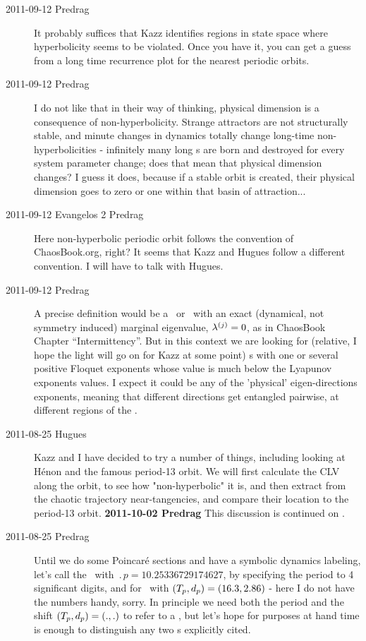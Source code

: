 \begin{description}
\item[2011-09-12 Predrag] It probably suffices that Kazz identifies 	
regions in state space where hyper\-bolicity seems to 	be violated. Once
you have it, you can get a guess from a long time recurrence plot for the
nearest periodic orbits.

\item[2011-09-12 Predrag] I do not like that in their way of thinking,
physical dimension is a consequence of non-hyperbolicity. Strange
attractors are not structurally stable, and minute changes in dynamics
totally change long-time non-hyperbolicities - infinitely many long \po s
are born and destroyed for every system parameter change; does that mean
that physical dimension changes? I guess it does, because if a stable
orbit is created, their physical dimension goes to zero or one within
that basin of attraction...

\item[2011-09-12 Evangelos 2 Predrag] Here non-hyperbolic periodic orbit follows
the convention of ChaosBook.org, right? It seems that Kazz and Hugues follow a
different convention. I will have to talk with Hugues.

\item[2011-09-12 Predrag]                           \toCB
A precise definition would be a \po\ or \rpo\ with an exact (dynamical,
not symmetry induced) marginal eigenvalue, $\eigExp[j] = 0$, as in
ChaosBook Chapter ``Intermittency''. But in this context we are looking
for (relative, I hope the light will go on for Kazz at some point) \po s
with one or several positive Floquet exponents whose value is much below
the Lyapunov exponents values. I expect it could be any of the 'physical'
eigen-directions exponents, meaning that different directions get
entangled pairwise, at different regions of the \statesp.

\item[2011-08-25 Hugues]
Kazz and I have decided to try a number of things, including looking at
H\'enon and the famous period-13 orbit. We will first calculate the CLV
along the orbit, to see how "non-hyperbolic" it is, and then extract from
the chaotic trajectory near-tangencies, and compare their location to the
period-13 orbit. {\bf 2011-10-02 Predrag} This discussion is continued on
.

\item[2011-08-25 Predrag]
Until we do some Poincar\'e sections and have a symbolic dynamics
labeling, let's call  the \po\ with
$\period{p}=10.25336729174627$, by specifying the period to 4 significant
digits, and  for \rpo\ with
$({T_{p}},d_p)=(16.3,2.86)$ - here I do not have the numbers
handy, sorry. In principle we need both the period and the shift
$({T_{p}},d_p)=(.,.)$ to refer to a \rpo, but let's hope for
purposes at hand time is enough to distinguish any two \rpo s explicitly
cited.


\end{description}

